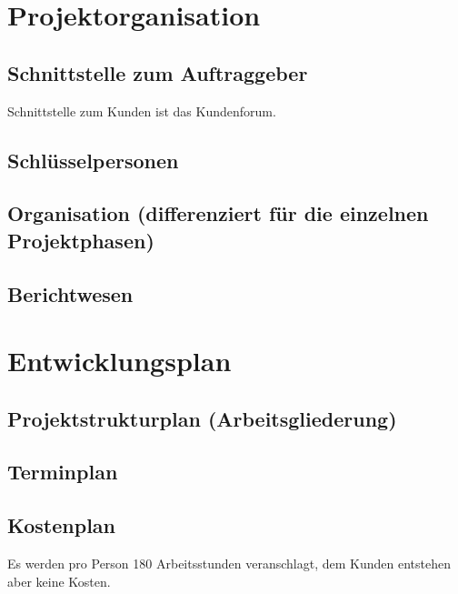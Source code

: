\documentclass[a4paper,10pt]{scrartcl}
\begin{document}
\section{Projektorganisation}
\subsection{Schnittstelle zum Auftraggeber}
Schnittstelle zum Kunden ist das Kundenforum. 
\subsection{Schlüsselpersonen}
\subsection{Organisation (differenziert für die einzelnen Projektphasen)}
\subsection{Berichtwesen}

\section{Entwicklungsplan}
\subsection{Projektstrukturplan (Arbeitsgliederung)}
\subsection{Terminplan}
\subsection{Kostenplan}
Es werden pro Person 180 Arbeitsstunden veranschlagt, dem Kunden entstehen aber keine Kosten.
\end{document}
